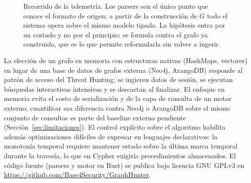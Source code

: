 \documentclass[11pt,a4paper]{article}
\begin{document}
\begin{figure}[htbp]
\centering
{}
\caption{Recorrido de la telemetría. Los parsers son el único punto que conoce
el formato de origen; a partir de la construcción de $G$ todo el sistema opera
sobre el mismo modelo tipado. La hipótesis entra por un costado y no por el
principio: se formula contra el grafo ya construido, que es lo que permite
reformularla sin volver a ingerir.}
\label{fig:pipeline}
\end{figure}

La elección de un grafo en memoria con estructuras nativas (HashMaps, vectores)
en lugar de una base de datos de grafos externa (Neo4j, ArangoDB) responde al
patrón de acceso del Threat Hunting: se ingieren datos de sesión, se ejecutan
búsquedas interactivas intensivas y se descartan al finalizar. El enfoque en
memoria evita el costo de serialización y de la capa de consulta de un motor
externo; cuantificar esa diferencia contra Neo4j o ArangoDB sobre el mismo
conjunto de consultas es parte del baseline externo pendiente
(Sección~\ref{sec:limitaciones}). El control explícito sobre el algoritmo
habilita además
optimizaciones difíciles de expresar en lenguajes declarativos: la monotonía
temporal requiere mantener estado sobre la última marca temporal durante la
travesía, lo que en Cypher exigiría procedimientos almacenados. El código
fuente (parsers y motor en Rust) se publica bajo licencia GNU GPLv3 en
\url{https://github.com/Base4Security/GraphHunter}.
\end{document}
